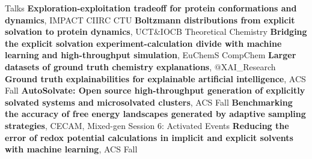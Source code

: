 \begin{rubric}{Talks}
\entry*[\hspace{1.05cm}2024] \textbf{Exploration-exploitation tradeoff for protein conformations and dynamics}, IMPACT CIIRC CTU
\entry*[\hspace{1.05cm}2023] \textbf{Boltzmann distributions from explicit solvation to protein dynamics}, UCT\&IOCB Theoretical Chemistry
\entry*[\hspace{1.05cm}2023] \textbf{Bridging the explicit solvation experiment-calculation divide with machine learning and high-throughput simulation}, EuChemS CompChem
\entry*[\hspace{1.05cm}2023] \textbf{Larger datasets of ground truth chemistry explanations}, $@$XAI\_Research
\entry*[\hspace{1.05cm}2022] \textbf{Ground truth explainabilities for explainable artificial intelligence}, ACS Fall
\entry*[\hspace{1.05cm}2022] \textbf{AutoSolvate: Open source high-throughput generation of explicitly solvated systems and microsolvated clusters}, ACS Fall
\entry*[\hspace{1.05cm}2021] \textbf{Benchmarking the accuracy of free energy landscapes generated by adaptive sampling strategies}, CECAM, Mixed-gen Session 6: Activated Events
\entry*[\hspace{1.05cm}2021] \textbf{Reducing the error of redox potential calculations in implicit and explicit solvents with machine learning}, ACS Fall
\end{rubric}


